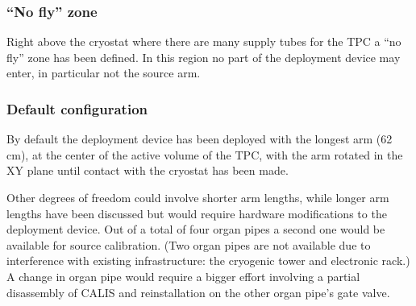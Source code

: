 \subsubsection{``No fly'' zone}
Right above the cryostat where there are many supply tubes for the TPC a ``no fly'' zone has been defined. In this region no part of the deployment device may enter, in particular not the source arm.


\subsubsection{Default configuration}
By default the deployment device has been deployed with the longest arm (62 cm), at the center of the active volume of the TPC, with the arm rotated in the XY plane until contact with the cryostat has been made. 

Other degrees of freedom could involve shorter arm lengths, while longer arm lengths have been discussed but would require hardware modifications to the deployment device. Out of a total of four organ pipes a second one would be available for source calibration. (Two organ pipes are not available due to interference with existing infrastructure: the cryogenic tower and electronic rack.) A change in organ pipe would require a bigger effort involving a partial disassembly of CALIS and reinstallation on the other organ pipe's gate valve.

